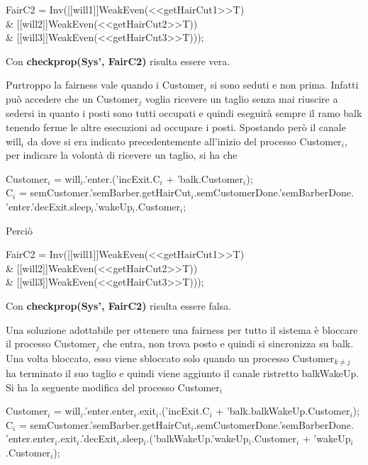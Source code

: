 \begin{center}
	\textsf{FairC2 = Inv([[will1]]WeakEven(<<getHairCut1>>T) \\\& [[will2]]WeakEven(<<getHairCut2>>T)) \\\& [[will3]]WeakEven(<<getHairCut3>>T)));}
\end{center}

Con \textbf{checkprop(Sys', FairC2)} risulta essere vera.

Purtroppo la fairness vale quando i \textsf{Customer$_{i}$} si sono seduti e non prima. Infatti può accedere che un \textsf{Customer$_{j}$} voglia ricevere un taglio senza mai riuscire a sedersi in quanto i posti sono tutti occupati e quindi eseguirà sempre il ramo \textsf{balk} tenendo ferme le altre esecuzioni ad occupare i posti. Spostando però il canale \textsf{will$_{i}$} da dove si era indicato precedentemente all'inizio del processo \textsf{Customer$_{i}$}, per indicare la volontà di ricevere un taglio, si ha che 

\textsf{Customer$_{i}$ = will$_{i}$.'enter.('incExit.C$_{i}$ + 'balk.Customer$_{i}$);}\\
\textsf{C$_{i}$ = semCustomer.'semBarber.getHairCut$_{i}$.semCustomerDone.'semBarberDone.\\'enter.'decExit.sleep$_{i}$.'wakeUp$_{i}$.Customer$_{i}$;}

Perciò

\begin{center}
	\textsf{FairC2 = Inv([[will1]]WeakEven(<<getHairCut1>>T) \\\& [[will2]]WeakEven(<<getHairCut2>>T)) \\\& [[will3]]WeakEven(<<getHairCut3>>T)));}
\end{center}

Con \textbf{checkprop(Sys', FairC2)} risulta essere falsa.

Una soluzione adottabile per ottenere una fairness per tutto il sistema è bloccare il processo \textsf{Customer$_{j}$} che entra, non trova posto e quindi si sincronizza su \textsf{balk}. Una volta bloccato, esso viene sbloccato solo quando un processo \textsf{Customer$_{k\not=j}$} ha terminato il suo taglio e quindi viene aggiunto il canale ristretto \textsf{balkWakeUp}. Si ha la seguente modifica del processo \textsf{Customer$_{i}$}

\textsf{Customer$_{i}$ = will$_{i}$.'enter.enter$_{i}$.exit$_{i}$.('incExit.C$_{i}$ + 'balk.balkWakeUp.Customer$_{i}$);}\\
\textsf{C$_{i}$ = semCustomer.'semBarber.getHairCut$_{i}$.semCustomerDone.'semBarberDone.\\'enter.enter$_{i}$.exit$_{i}$.'decExit$_{i}$.sleep$_{i}$.('balkWakeUp.'wakeUp$_{i}$.Customer$_{i}$ + 'wakeUp$_{i}$.Customer$_{i}$);}


